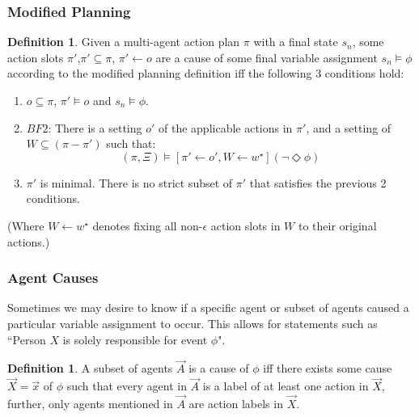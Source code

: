 \documentclass{article}
\theoremstyle{plain}
\theoremstyle{definition}
\newtheorem{defn}[thm]{Definition} %
\begin{document}
\subsubsection*{Modified Planning}
\begin{defn}
Given a multi-agent action plan $\pi$ with a final state $s_n$, some action slots $\pi'$,$\pi' \subseteq \pi$, $\pi' \leftarrow o$ are a cause of some final variable assignment $s_n \models \phi$ according to the modified planning definition iff the following 3 conditions hold:
\begin{enumerate}
\item  $o \subseteq \pi$, $\pi' \models o$ and $s_n \models \phi$.
\item $BF2$: There is a setting $o'$ of the applicable actions in $\pi'$, and a setting of $W \subseteq (\pi  - \pi')$ such that:
\[
(\pi, \Xi) \models [\pi' \leftarrow o', W \leftarrow w^\star](\lnot \Diamond \phi)
\]
\item $\pi'$ is minimal. There is no strict subset of $\pi'$ that satisfies the previous 2 conditions.
\end{enumerate}


(Where $W\leftarrow w^\star$ denotes fixing all non-$\epsilon$ action slots in $W$ to their original actions.)

\end{defn}

\subsubsection*{Agent Causes}
Sometimes we may desire to know if a specific agent or subset of agents caused a particular variable assignment to occur. This allows for statements such as ``Person $X$ is solely responsible for event $\phi$".
\begin{defn}
A subset of agents $\vec{A}$ is a cause of $\phi$ iff there exists some cause $\vec{X}=\vec{x}$ of $\phi$ such that every agent in $\vec{A}$ is a label of at least one action in $\vec{X}$, further, only agents mentioned in $\vec{A}$ are action labels in $\vec{X}$.
\end{defn}
\end{document}
